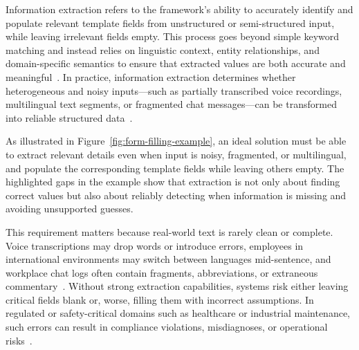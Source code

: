 Information extraction refers to the framework’s ability to accurately identify and populate relevant template fields from unstructured or semi-structured input, while leaving irrelevant fields empty. This process goes beyond simple keyword matching and instead relies on linguistic context, entity relationships, and domain-specific semantics to ensure that extracted values are both accurate and meaningful~\cite{grishman1997information, sarawagi2008information}. In practice, information extraction determines whether heterogeneous and noisy inputs—such as partially transcribed voice recordings, multilingual text segments, or fragmented chat messages—can be transformed into reliable structured data~\cite{jurafsky2023speech, liu2022conversational}.  

As illustrated in Figure~\ref{fig:form-filling-example}, an ideal solution must be able to extract relevant details even when input is noisy, fragmented, or multilingual, and populate the corresponding template fields while leaving others empty. The highlighted gaps in the example show that extraction is not only about finding correct values but also about reliably detecting when information is missing and avoiding unsupported guesses.

This requirement matters because real-world text is rarely clean or complete. Voice transcriptions may drop words or introduce errors, employees in international environments may switch between languages mid-sentence, and workplace chat logs often contain fragments, abbreviations, or extraneous commentary~\cite{baldwin2013noisy}. Without strong extraction capabilities, systems risk either leaving critical fields blank or, worse, filling them with incorrect assumptions. In regulated or safety-critical domains such as healthcare or industrial maintenance, such errors can result in compliance violations, misdiagnoses, or operational risks~\cite{radford2023whisper, fathullah2023prompting}.  

